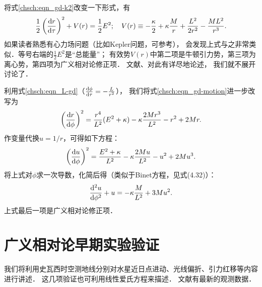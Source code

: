 将式\eqref{chsch:eqn_gd-k2}改变一下形式，有
\begin{equation}\label{chsch:eqn_gd-motion}
    \frac{1}{2}\left( \frac{{\rm d}r}{{\rm d} \tau}\right)^2 
    +V(r) =\frac{1}{2}E^2;\quad
    V(r)\equiv %
    -\frac{\kappa}{2} + \kappa\frac{M}{r} + \frac{L^2}{2r^2} - \frac{M L^2}{r^3}.
\end{equation}
如果读者熟悉有心力场问题（比如Kepler问题，可参考\parencite[\S 4.7]{zhuzx-zy-vI}），
会发现上式与之非常类似．等号右端的$\frac{1}{2}E^2$是“总能量”；
有效势$V(r)$中第二项是牛顿引力势，第三项为离心势，第四项为广义相对论修正项．
文献\parencite[Ch.25]{mtw1973}、\parencite[\S19,\S20]{chandrasekhar-1983}对此有详尽地论述，
我们就不展开讨论了．

利用式\eqref{chsch:eqn_L-gd}（$\frac{{\rm d} \phi}{{\rm d} \tau}=-\frac{L}{r^2}$），
我们将式\eqref{chsch:eqn_gd-motion}进一步改写为
\begin{equation}
    \left( \frac{{\rm d}r}{{\rm d} \phi}\right)^2=
    \frac{r^4}{L^2}(E^2+\kappa)-\kappa \frac{2Mr^3}{L^2} -r^2 + 2Mr.
\end{equation}
作变量代换$u=1/r$，可得如下方程：
\begin{equation}
    \left( \frac{{\rm d}u}{{\rm d} \phi}\right)^2=
    \frac{E^2+\kappa}{L^2}-\kappa \frac{2Mu}{L^2} -u^2 + 2Mu^3.
\end{equation}
将上式对$\phi$求一次导数，化简后得（类似于Binet方程，见\parencite[p.315]{zhuzx-zy-vI}式(4.32)）：
\begin{equation}\label{chsch:eqn_gd-Binet}
    \frac{{\rm d}^2 u}{{\rm d} \phi^2}+u = -\kappa \frac{M}{L^2} + 3Mu^2.
\end{equation}
上式最后一项是广义相对论修正项．

\section{广义相对论早期实验验证}
我们将利用史瓦西时空测地线分别对水星近日点进动、光线偏折、引力红移等内容进行讲述．
这几项验证也可利用线性爱氏方程\cite[Ch.4]{ohanian-ruffini-2013}来描述．
文献\parencite[Ch.7]{will_tegp-2018}有最新的观测数据．


